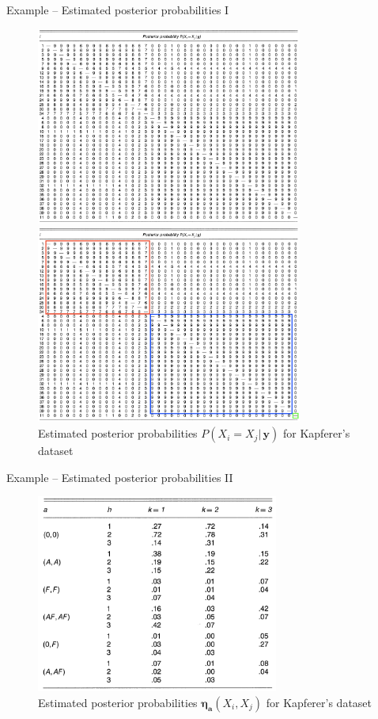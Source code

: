 \documentclass[aspectratio=169,xcolor=dvipsnames]{beamer}
\newcommand{\veca}{\boldsymbol{a}}
\newcommand{\vecy}{\textbf{y}}
\newcommand{\veceta}{\boldsymbol{\eta}}
\begin{document}
\begin{frame}{Example – Estimated posterior probabilities I}
\begin{figure}
    \begin{overprint}
    \centering
     \centering \includegraphics[keepaspectratio, height = 6.5cm]{utilities/exp_x.png}
    \caption{Estimated posterior probabilities $P(X_i=X_j| \, \vecy)$ for Kapferer's dataset}
    \label{fig:2}
    \setcounter{figure}{1}
     \centering \includegraphics[keepaspectratio, height = 6.5cm]{utilities/exp_x_labels.png}  \caption{Estimated posterior probabilities $P(X_i=X_j| \, \vecy)$ for Kapferer's dataset}
    \label{fig:2}
    \end{overprint}
\end{figure}
    
\end{frame}
\begin{frame}{Example – Estimated posterior probabilities II}
\begin{figure}
    \centering
    \includegraphics[keepaspectratio, height = 6.5cm]{utilities/exp_eta.png}
    \caption{Estimated posterior probabilities $\veceta_{\veca}(X_i,X_j)$ for Kapferer's dataset}
    \label{fig:3}
\end{figure}
    
\end{frame}
\end{document}
